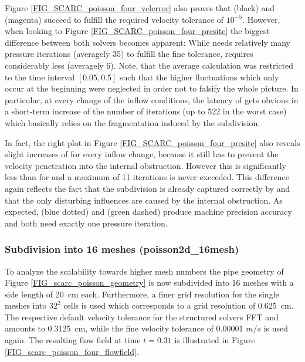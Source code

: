 Figure \ref{FIG_SCARC_poisson_four_velerror} also proves that
\ffttight{} (black) and \scarctight{} (magenta) succeed to fulfill the required velocity tolerance of $10^{-5}$. 
However, when looking to Figure \ref{FIG_SCARC_poisson_four_presite} the biggest difference between both solvers becomes apparent: While \ffttight{} needs relatively many pressure iterations (averagely 35) to fulfill the fine tolerance, \scarctight{} requires considerably less (averagely 6). 
Note, that the average calculation was restricted to the time interval $[0.05,0.5]$ such that the higher fluctuations which only occur
at the beginning were neglected in order not to falsify the whole picture.
In particular, at every change of the inflow conditions, the latency of \ffttight{} gets obvious in a short-term increase of the number of iterations (up to 522 in the worst case) which basically relies on the fragmentation induced by the subdivision. 

In fact, the right plot in Figure \ref{FIG_SCARC_poisson_four_presite} also reveals slight increases of \scarctight{} for every inflow change, because it still has to prevent the velocity penetration into the internal obstruction. However this is significantly less than for \ffttight{} and a maximum of 11 iterations is never exceeded.
This difference again reflects the fact that the subdivision is already captured correctly by \scarc{} and that the only disturbing influences are caused by the internal obstruction.
%
As expected, \uglmat{} (blue dotted) and \uscarc{} (green dashed)
produce machine precision accuracy and both need exactly one pressure iteration.



\subsubsection{Subdivision into 16 meshes ({\ct poisson2d\_16mesh})}
\label{SEC_SCARC_poisson_sixteen}

To analyze the scalability towards higher mesh numbers the pipe geometry of Figure \ref{FIG_scarc_poisson_geometry} is now subdivided into 16 meshes with a side length of 20~cm  each. Furthermore, a finer grid resolution for the single meshes into $32^2$ cells is used which corresponds to a grid resolution of 0.625~cm. The respective default velocity tolerance for the structured solvers FFT and \scarc{} amounts to 0.3125~cm, while the fine velocity tolerance of 0.00001 $m/s$ is used again.
The resulting flow field at time $t=0.31$ is illustrated in Figure \ref{FIG_scarc_poisson_four_flowfield}.


